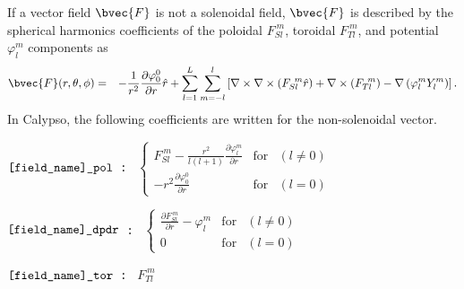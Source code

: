 If a vector field $\bvec{F}$ is not a solenoidal field, $\bvec{F}$ is described by the spherical harmonics coefficients of the poloidal $F_{Sl}^{\ m}$, toroidal $F_{Tl}^{\ m}$, and potential $\varphi_{l}^{m}$ components as
\begin{eqnarray}
\bvec{F}(r, \theta, \phi) & = &  - \frac{1}{r^{2}}\frac{\partial \varphi_{0}^{0}}{\partial r} \hat{r}
 + \sum_{l=1}^{L} \sum_{m=-l}^{l} 
\left[\nabla \times \nabla \times \left( F_{Sl}^{\ m} \hat{r} \right) +  \nabla \times \left(F_{Tl}^{\ m}\right)
 - \nabla \left(\varphi_{l}^{m} Y_{l}^{m} \right)\right].
\nonumber
\end{eqnarray}
In Calypso, the following coefficients are written for the non-solenoidal vector.
\begin{description}
\item{\tt  $\verb|[field_name]_pol|$ : }
 $\left\{\begin{array}{ccr}
\displaystyle{
F_{Sl}^{\ m} - \frac{r^{2}}{l \left(l+1\right)} \frac{\partial \varphi_{l}^{m}}{\partial r} }
& \mbox{for} & \left (l \ne 0 \right)\\
\displaystyle{
 -r^{2} \frac{\partial \varphi_{0}^{0}}{\partial r}
} & \mbox{for} & \left (l = 0 \right)
\end{array}
\right.$
\item{\tt  $\verb|[field_name]_dpdr|$ : } 
$
\left\{
\begin{array}{ccr}
\displaystyle{
\frac{\partial F_{Sl}^{\ m}}{\partial r} - \varphi_{l}^{m}}
 & \mbox{for} & \left (l \ne 0 \right)\\
 0 & \mbox{for} & \left (l = 0 \right)
\end{array}
\right. $
\item{\tt  $\verb|[field_name]_tor|$ : }  $F_{Tl}^{\ m}$
\end{description}


